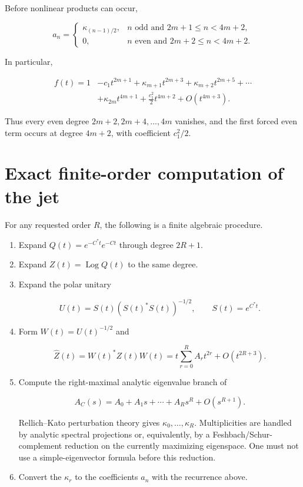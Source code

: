 \documentclass[11pt,a4paper]{article}
\DeclareMathOperator{\Log}{Log}
\begin{document}
Before nonlinear products can occur,

\[
a_n=
\begin{cases}
\kappa_{(n-1)/2},&n\text{ odd and }2m+1\le n<4m+2,\\
0,&n\text{ even and }2m+2\le n<4m+2.
\end{cases}
\]

In particular,

\[
\begin{aligned}
f(t)=1&-c_1t^{2m+1}
 +\kappa_{m+1}t^{2m+3}
 +\kappa_{m+2}t^{2m+5}+\cdots\\
 &+\kappa_{2m}t^{4m+1}
 +\frac{c_1^2}{2}t^{4m+2}
 +O(t^{4m+3}).
\end{aligned}
\]

Thus every even degree \(2m+2,2m+4,\ldots,4m\) vanishes, and the first forced even term occurs at degree \(4m+2\), with coefficient \(c_1^2/2\).

\section{Exact finite-order computation of the jet}\label{exact-finite-order-computation-of-the-jet}

For any requested order \(R\), the following is a finite algebraic procedure.

\begin{enumerate}
\def\labelenumi{\arabic{enumi}.}
\item
  Expand \(Q(t)=e^{-C^*t}e^{-Ct}\) through degree \(2R+1\).
\item
  Expand \(Z(t)=\Log Q(t)\) to the same degree.
\item
  Expand the polar unitary

  \[
  U(t)=S(t)(S(t)^*S(t))^{-1/2},\qquad S(t)=e^{C^*t}.
  \]
\item
  Form \(W(t)=U(t)^{-1/2}\) and

  \[
  \widehat Z(t)=W(t)^*Z(t)W(t)=t\sum_{r=0}^{R}A_rt^{2r}+O(t^{2R+3}).
  \]
\item
  Compute the right-maximal analytic eigenvalue branch of

  \[
  A_C(s)=A_0+A_1s+\cdots+A_Rs^R+O(s^{R+1}).
  \]

  Rellich--Kato perturbation theory gives \(\kappa_0,\ldots,\kappa_R\). Multiplicities are handled by analytic spectral projections or, equivalently, by a Feshbach/Schur-complement reduction on the currently maximizing eigenspace. One must not use a simple-eigenvector formula before this reduction.
\item
  Convert the \(\kappa_r\) to the coefficients \(a_n\) with the recurrence above.
\end{enumerate}
\end{document}
